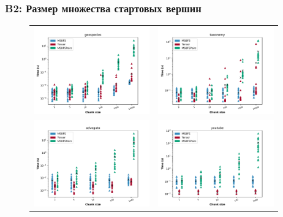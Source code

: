 \documentclass{beamer}
\begin{document}
\begin{frame}[fragile]
  \frametitle{B2: Размер множества стартовых вершин}
  \begin{figure}
    \begin{tabular}{cc}
      \includegraphics[width=50mm]{pictures/chunks-geospecies.pdf} & \includegraphics[width=50mm]{pictures/chunks-taxonomy.pdf} \\
      \includegraphics[width=50mm]{pictures/chunks-advogato.pdf}   & \includegraphics[width=50mm]{pictures/chunks-youtube.pdf}  \\
    \end{tabular}
  \end{figure}
\end{frame}
\end{document}
